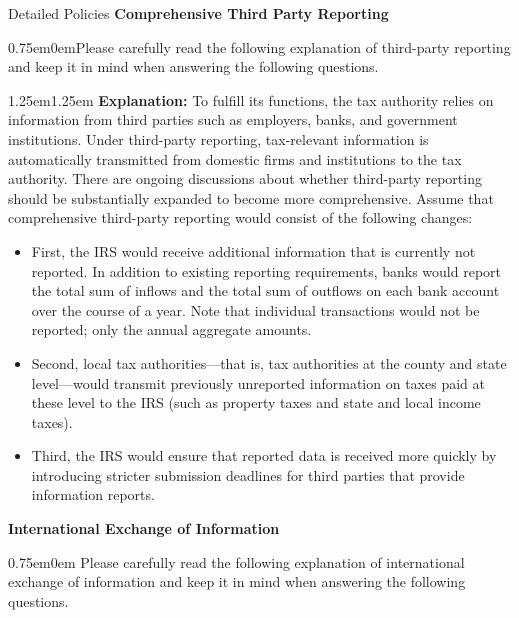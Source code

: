 \documentclass{beamer}
\begin{document}
\begin{frame}[allowframebreaks]{Detailed Policies}
\label{DetailedPolicies}
\footnotesize
\textbf{Comprehensive Third Party Reporting} \\
\begin{adjustwidth}{0.75em}{0em}Please carefully read the following explanation of third-party reporting and keep it in mind when answering the following questions.\end{adjustwidth} 
\vspace{0.5em}

\begin{adjustwidth}{1.25em}{1.25em}  \textbf{Explanation:}
To fulfill its functions, the tax authority relies on information from third parties such as employers, banks, and government institutions. Under third-party reporting, tax-relevant information is automatically transmitted from domestic firms and institutions to the tax authority. There are ongoing discussions about whether third-party reporting should be substantially expanded to become more comprehensive. Assume that comprehensive third-party reporting would consist of the following changes:
\begin{itemize}
    \item First, the IRS would receive additional information that is currently not reported. In addition to existing reporting requirements, banks would report the total sum of inflows and the total sum of outflows on each bank account over the course of a year. Note that individual transactions would not be reported; only the annual aggregate amounts.
    \item Second, local tax authorities—that is, tax authorities at the county and state level—would transmit previously unreported information on taxes paid at these level to the IRS (such as property taxes and state and local income taxes).
    \item Third, the IRS would ensure that reported data is received more quickly by introducing stricter submission deadlines for third parties that provide information reports.
\end{itemize}
\end{adjustwidth} 
\vspace{2em}
\textbf{International Exchange of Information}\\
\begin{adjustwidth}{0.75em}{0em} Please carefully read the following explanation of international exchange of information and keep it in mind when answering the following questions.\end{adjustwidth}

\end{frame}
\end{document}
